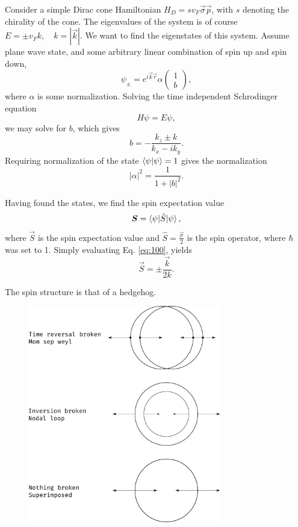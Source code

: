 Consider a simple Dirac cone Hamiltonian \(H_{D} = s v_{F} \vec{\sigma} \vec{p}\), with \(s\) denoting the chirality of the cone.
The eigenvalues of the system is of course \(E = \pm v_{F} k, \quad k=|\vec{k}|\).
We want to find the eigenstates of this system.
Assume plane wave state, and some arbitrary linear combination of spin up and spin down,
\[
  \psi _{\pm} = e^{i \vec{k} \vec{r}} \alpha
  \begin{pmatrix}
    1\\
    b
  \end{pmatrix},
\]
where \(\alpha \) is some normalization.
Solving the time independent Schrodinger equation
\[
H \psi = E \psi,
\]
we may solve for \(b\), which gives
\begin{equation}
  \label{eq:99}
  b = -\frac{k_{z} \pm k}{k_{x} - i k_{y}}.
\end{equation}
Requiring normalization of the state \(\braket{\psi | \psi } = 1\) gives the normalization
\[
|\alpha |^2 = \frac{1}{1 + |b|^2}.
\]

Having found the states, we find the spin expectation value
\begin{equation}
  \label{eq:100}
  \bm{S} = \braket{\psi | \hat{S} | \psi },
\end{equation}
where \(\vec{S}\) is the spin expectation value and \(\hat{S} = \frac{\vec{\sigma}}{2} \) is the spin operator, where \(\hbar \) was set to 1.
Simply evaluating Eq. \eqref{eq:100}, yields
\begin{equation}
  \label{eq:101}
  \vec{S} = \pm \frac{\vec{k}}{2 k}.
\end{equation}

The spin structure is that of a hedgehog.

\begin{figure}[ht]
  \centering
  \includegraphics[width=0.75\textwidth]{figures/spinStructureWeyl}
  \caption{\label{fig:spinStructure} }
\end{figure}



